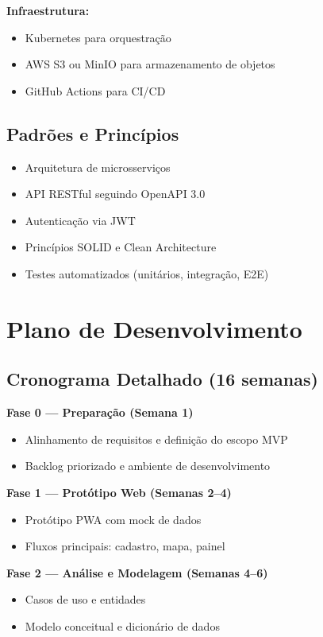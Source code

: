 \documentclass[12pt,a4paper]{article}
\begin{document}
\textbf{Infraestrutura:}
\begin{itemize}
    \item Kubernetes para orquestração
    \item AWS S3 ou MinIO para armazenamento de objetos
    \item GitHub Actions para CI/CD
\end{itemize}

\subsection{Padrões e Princípios}

\begin{itemize}
    \item Arquitetura de microsserviços
    \item API RESTful seguindo OpenAPI 3.0
    \item Autenticação via JWT
    \item Princípios SOLID e Clean Architecture
    \item Testes automatizados (unitários, integração, E2E)
\end{itemize}

\section{Plano de Desenvolvimento}
\label{sec:desenvolvimento}

\subsection{Cronograma Detalhado (16 semanas)}

\textbf{Fase 0 — Preparação (Semana 1)}
\begin{itemize}
    \item Alinhamento de requisitos e definição do escopo MVP
    \item Backlog priorizado e ambiente de desenvolvimento
\end{itemize}

\textbf{Fase 1 — Protótipo Web (Semanas 2–4)}
\begin{itemize}
    \item Protótipo PWA com mock de dados
    \item Fluxos principais: cadastro, mapa, painel
\end{itemize}

\textbf{Fase 2 — Análise e Modelagem (Semanas 4–6)}
\begin{itemize}
    \item Casos de uso e entidades
    \item Modelo conceitual e dicionário de dados
\end{itemize}
\end{document}
